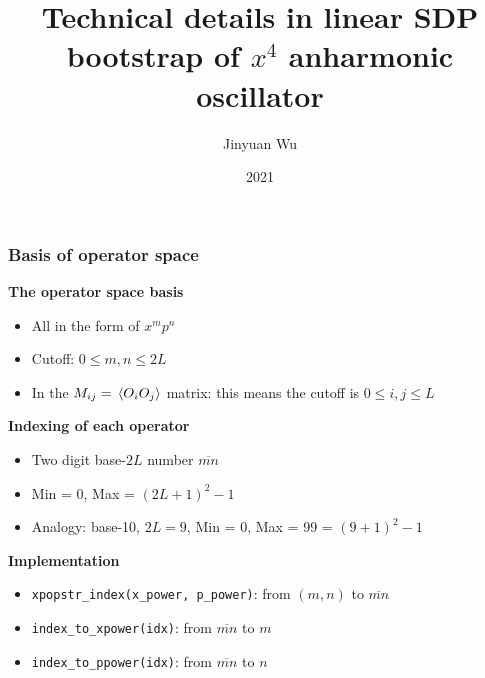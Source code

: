 \documentclass{beamer}
\title{Technical details in linear SDP bootstrap of $x^4$ anharmonic oscillator}
\author{Jinyuan Wu}
\institute{Department of Physics, Fudan University}
\date{2021}
\begin{document}
\frame{\titlepage}

\begin{frame}
\frametitle{Basis of operator space}

\textbf{The operator space basis}

\begin{itemize}
    \item All in the form of $x^m p^n$ 
    \item Cutoff: $0 \leq m, n \leq 2L$
    \item In the $M_{ij} = \expval*{O_i O_j}$ matrix: this means the cutoff is $0 \leq i, j \leq L$
\end{itemize}    

\textbf{Indexing of each operator}

\begin{itemize}
    \item Two digit base-$2L$ number $\overline{mn}$
    \item Min = $0$, Max = $(2 L + 1)^2 - 1$ 
    \item Analogy: base-10, $2L = 9$, Min = 0, Max = 99 = $(9 + 1)^2 - 1$
\end{itemize}

\textbf{Implementation}

\begin{itemize}
    \item \texttt{xpopstr\_index(x\_power, p\_power)}: from $(m, n)$ to $\overline{mn}$
    \item \texttt{index\_to\_xpower(idx)}: from $\overline{mn}$ to $m$
    \item \texttt{index\_to\_ppower(idx)}: from $\overline{mn}$ to $n$
\end{itemize}

\end{frame}
\end{document}
